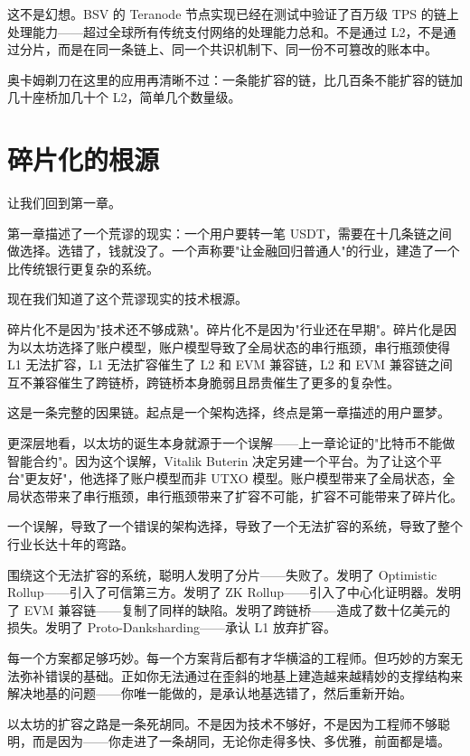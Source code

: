 \documentclass[a4paper,12pt,openany]{ctexbook}
\begin{document}
这不是幻想。BSV 的 Teranode 节点实现已经在测试中验证了百万级 TPS 的链上处理能力——超过全球所有传统支付网络的处理能力总和。不是通过 L2，不是通过分片，而是在同一条链上、同一个共识机制下、同一份不可篡改的账本中。

奥卡姆剃刀在这里的应用再清晰不过：一条能扩容的链，比几百条不能扩容的链加几十座桥加几十个 L2，简单几个数量级。


\section*{碎片化的根源}


让我们回到第一章。

第一章描述了一个荒谬的现实：一个用户要转一笔 USDT，需要在十几条链之间做选择。选错了，钱就没了。一个声称要"让金融回归普通人"的行业，建造了一个比传统银行更复杂的系统。

现在我们知道了这个荒谬现实的技术根源。

碎片化不是因为"技术还不够成熟"。碎片化不是因为"行业还在早期"。碎片化是因为以太坊选择了账户模型，账户模型导致了全局状态的串行瓶颈，串行瓶颈使得 L1 无法扩容，L1 无法扩容催生了 L2 和 EVM 兼容链，L2 和 EVM 兼容链之间互不兼容催生了跨链桥，跨链桥本身脆弱且昂贵催生了更多的复杂性。

这是一条完整的因果链。起点是一个架构选择，终点是第一章描述的用户噩梦。

更深层地看，以太坊的诞生本身就源于一个误解——上一章论证的"比特币不能做智能合约"。因为这个误解，Vitalik Buterin 决定另建一个平台。为了让这个平台"更友好"，他选择了账户模型而非 UTXO 模型。账户模型带来了全局状态，全局状态带来了串行瓶颈，串行瓶颈带来了扩容不可能，扩容不可能带来了碎片化。

一个误解，导致了一个错误的架构选择，导致了一个无法扩容的系统，导致了整个行业长达十年的弯路。

围绕这个无法扩容的系统，聪明人发明了分片——失败了。发明了 Optimistic Rollup——引入了可信第三方。发明了 ZK Rollup——引入了中心化证明器。发明了 EVM 兼容链——复制了同样的缺陷。发明了跨链桥——造成了数十亿美元的损失。发明了 Proto-Danksharding——承认 L1 放弃扩容。

每一个方案都足够巧妙。每一个方案背后都有才华横溢的工程师。但巧妙的方案无法弥补错误的基础。正如你无法通过在歪斜的地基上建造越来越精妙的支撑结构来解决地基的问题——你唯一能做的，是承认地基选错了，然后重新开始。

以太坊的扩容之路是一条死胡同。不是因为技术不够好，不是因为工程师不够聪明，而是因为——你走进了一条胡同，无论你走得多快、多优雅，前面都是墙。
\end{document}

